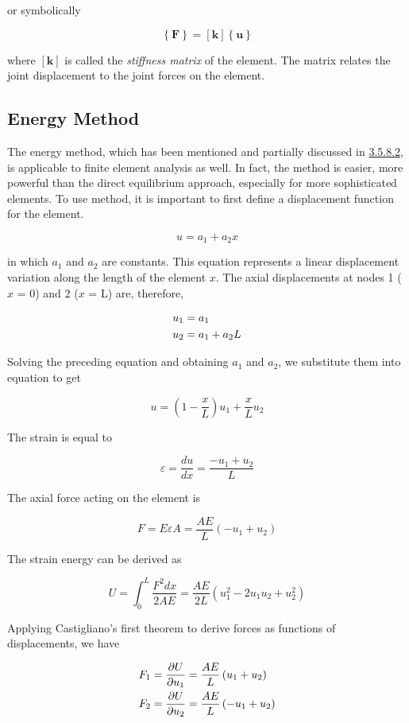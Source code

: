 \documentclass[a4paper,openany,12pt]{book}
\begin{document}
{{or symbolically

$$\left\{ \mathbf{F} \right\} = \left[ \mathbf{k} \right]\left\{ \mathbf{u} \right\}$$

where \([\mathbf{k}]\) is called the \emph{stiffness matrix} of the element.
The matrix relates the joint displacement to the joint forces on the
element.

\subsection{Energy Method}
\label{sec:orgca29a4b}
The energy method, which has been mentioned and partially discussed in
\hyperref[sec:org0f22e64]{3.5.8.2}, is applicable to finite element
analysis as well. In fact, the method is easier, more powerful than the
direct equilibrium approach, especially for more sophisticated elements.
To use method, it is important to first define a displacement function
for the element.

$$u = a_1 + a_2x$$

in which \(a_1\) and \(a_2\) are constants. This equation represents a
linear displacement variation along the length of the element \(x\). The
axial displacements at nodes 1 (\(x\) = 0) and 2 (\(x\) = L) are, therefore,

$$\begin{gathered}
  u_1 = a_1 \hfill \\
  u_2 = a_1 + a_2L \hfill \\ 
\end{gathered}$$

Solving the preceding equation and obtaining \(a_1\) and \(a_2\), we
substitute them into equation to get

$$u = \left( 1 - \frac{x}{L} \right)u_1 + \frac{x}{L}u_2$$

The strain is equal to

$$\varepsilon  = \frac{du}{dx} = \frac{-u_1 + u_2}{L}$$

The axial force acting on the element is

$$F = E\varepsilon A = \frac{{AE}}{L}( - {u_1} + {u_2})$$

The strain energy can be derived as

$$U = \int_0^L \frac{F^2dx}{2AE} = \frac{AE}{2L}\left( u_1^2 - 2u_1u_2 + u_2^2 \right)$$

Applying Castigliano's first theorem to derive forces as functions of
displacements, we have

\begin{gather}
\label{eq:org4b98182}
  F_1 = \frac{\partial U}{\partial u_1} = \frac{AE}{L}\left( u_1 + u_2 \right) \hfill \\
  F_2 = \frac{\partial U}{\partial u_2} = \frac{AE}{L}\left( -u_1 + u_2 \right) \hfill \\ 
\end{gather}

}}
\end{document}
